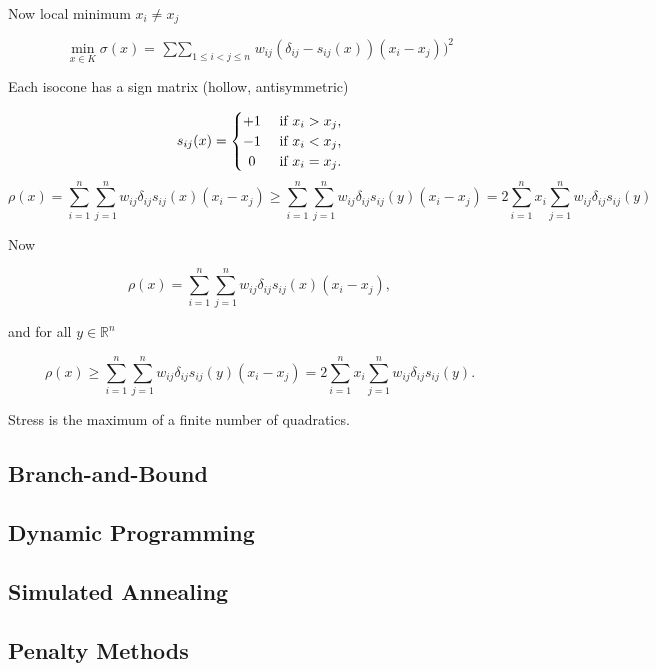 \documentclass[
  12pt,
]{book}
\theoremstyle{definition}
\theoremstyle{definition}
\theoremstyle{definition}
\theoremstyle{definition}
\theoremstyle{remark}
\begin{document}
Now local minimum \(x_i\not= x_j\)

\[
\min_{x\in K}\sigma(x)=\mathop{\sum\sum}_{1\leq i<j\leq n}w_{ij}(\delta_{ij}-s_{ij}(x))(x_i-x_j))^2
\]

Each isocone has a sign matrix (hollow, antisymmetric)

\[
s_{ij}(x)=\begin{cases}+1&\text{ if }x_i>x_j,\\
-1&\text{ if }x_i<x_j,\\
\hfill 0&\text{ if }x_i=x_j.
\end{cases}
\] \[
\rho(x)=\sum_{i=1}^n\sum_{j=1}^nw_{ij}\delta_{ij}s_{ij}(x)(x_i-x_j)\geq
\sum_{i=1}^n\sum_{j=1}^nw_{ij}\delta_{ij}s_{ij}(y)(x_i-x_j)=
2\sum_{i=1}^n x_i\sum_{j=1}^n w_{ij}\delta_{ij}s_{ij}(y)
\]

Now

\begin{equation}
\rho(x)=\sum_{i=1}^n\sum_{j=1}^nw_{ij}\delta_{ij}s_{ij}(x)(x_i-x_j),
\end{equation}

and for all \(y\in\mathbb{R}^n\)

\begin{equation}
\rho(x)\geq
\sum_{i=1}^n\sum_{j=1}^nw_{ij}\delta_{ij}s_{ij}(y)(x_i-x_j)=
2\sum_{i=1}^n x_i\sum_{j=1}^n w_{ij}\delta_{ij}s_{ij}(y).
\end{equation}

Stress is the maximum of a finite number of quadratics.

\hypertarget{unibranchbound}{%
\subsection{Branch-and-Bound}\label{unibranchbound}}

\hypertarget{unidynamic}{%
\subsection{Dynamic Programming}\label{unidynamic}}

\hypertarget{uniannealing}{%
\subsection{Simulated Annealing}\label{uniannealing}}

\hypertarget{unipenalty}{%
\subsection{Penalty Methods}\label{unipenalty}}
\end{document}
